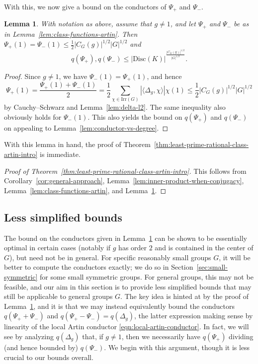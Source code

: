 \documentclass[12pt]{amsart}
\newtheorem{lemma}[theorem]{Lemma}
\theoremstyle{definition} \newtheorem{definition}[theorem]{Definition}
\theoremstyle{example} \newtheorem{example}[theorem]{Example}
\theoremstyle{remark} \newtheorem{remark}{Remark}[theorem]
\numberwithin{equation}{section}
\numberwithin{theorem}{section}
\renewcommand{\leq}{\leqslant}
\begin{document}
	With this, we now give a bound on the conductors of $\Psi_+$ and $\Psi_-$.
	
	\begin{lemma} \label{lem:conditional-conductor}
		With notation as above, assume that $g \ne 1$, and let $\Psi_+$ and $\Psi_-$ be as in Lemma~\ref{lem:class-functions-artin}.  Then $\Psi_+(1) = \Psi_-(1) \leq \frac{1}{2} |C_G(g)|^{1/2} |G|^{1/2}$ and
			\[
				q(\Psi_+),q(\Psi_-)
					\leq |\mathrm{Disc}(K)|^{\frac{|C_G(g)|^{1/2}}{|G|^{1/2}}}.
			\]
	\end{lemma}
	\begin{proof}
		Since $g \ne 1$, we have $\Psi_-(1) = \Psi_+(1)$, and hence
			\[
				\Psi_+(1)
					= \frac{\Psi_+(1) + \Psi_-(1)}{2} 
					= \frac{1}{2} \sum_{\chi \in \mathrm{Irr}(G)} |\langle \Delta_g,\chi\rangle| \chi(1)
					\leq \frac{1}{2} |C_G(g)|^{1/2} |G|^{1/2}
			\]
		by Cauchy--Schwarz and Lemma~\ref{lem:delta-l2}.  The same inequality also obviously holds for $\Psi_-(1)$.  This also yields the bound on $q(\Psi_+)$ and $q(\Psi_-)$ on appealing to Lemma~\ref{lem:conductor-vs-degree}.  
	\end{proof}
	
	With this lemma in hand, the proof of Theorem~\ref{thm:least-prime-rational-class-artin-intro} is immediate.
	
	\begin{proof} [Proof of Theorem~\ref{thm:least-prime-rational-class-artin-intro}]
		This follows from Corollary~\ref{cor:general-approach}, Lemma~\ref{lem:inner-product-when-conjugacy}, Lemma~\ref{lem:class-functions-artin}, and Lemma~\ref{lem:conditional-conductor}.
	\end{proof}
	
\subsection{Less simplified bounds} \label{subsec:less-simplified}

	The bound on the conductors given in Lemma~\ref{lem:conditional-conductor} can be shown to be essentially optimal in certain cases (notably if $g$ has order $2$ and is contained in the center of $G$), but need not be in general.  For specific reasonably small groups $G$, it will be better to compute the conductors exactly; we do so in Section~\ref{sec:small-symmetric} for some small symmetric groups.  For general groups, this may not be feasible, and our aim in this section is to provide less simplified bounds that may still be applicable to general groups $G$.  The key idea is hinted at by the proof of Lemma~\ref{lem:conditional-conductor}, and it is that we may instead equivalently bound the conductors $q(\Psi_+ + \Psi_-)$ and $q(\Psi_+ - \Psi_-) = q(\Delta_g)$, the latter expression making sense by linearity of the local Artin conductor \eqref{eqn:local-artin-conductor}.  In fact, we will see by analyzing $q(\Delta_g)$ that, if $g \ne 1$, then we necessarily have $q(\Psi_+)$ dividing (and hence bounded by) $q(\Psi_-)$.  We begin with this argument, though it is less crucial to our bounds overall.
	
\end{document}
